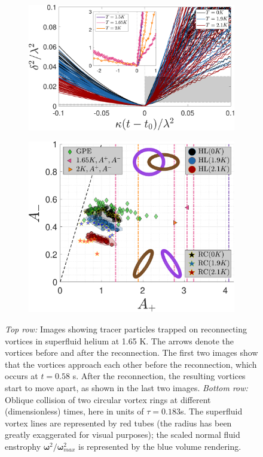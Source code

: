 \documentclass[
  reprint,
superscriptaddress,
 amsmath,amssymb,
 aps,
prb,
]{revtex4-2}
\newcommand{\bom}{\boldsymbol{\omega}}
\begin{document}
\begin{figure}[t]
	\centering
	\begin{subfigure}[b]{0.45\textwidth}
		\centering
		\includegraphics*[width=\textwidth]{min-delta-with-exp.pdf}
		\caption{}
		\label{fig:minimum-distance}
	\end{subfigure}
	\begin{subfigure}[b]{0.45\textwidth}
		\centering
		\includegraphics*[width=\textwidth]{prefactors-with-exp.pdf}
		\caption{}
		\label{fig:prefactors}
	\end{subfigure}
\caption{\emph{Top row:} Images showing tracer particles trapped on reconnecting vortices in superfluid helium at 1.65 K. The arrows denote the vortices before and after the reconnection. The first two images show that the vortices approach each other before the reconnection, which occurs at $t=0.58$ s. After the reconnection, the resulting vortices start to move apart, as shown in the last two images.
	\emph{Bottom row:} Oblique collision of two circular vortex rings at different 
	(dimensionless) times, here in units of $\tau=0.183$s.
	The superfluid vortex lines are represented by red tubes (the radius has been greatly 
	exaggerated for visual purposes); the scaled normal fluid enstrophy 
	$\bom^2/\bom^2_{max}$ is represented by the blue volume rendering.}
\end{figure}
\end{document}
